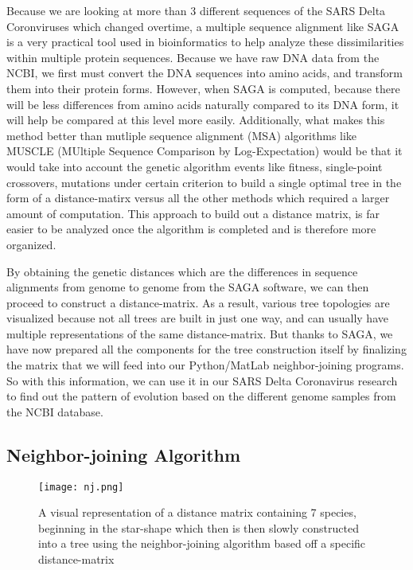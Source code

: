 Because we are looking at more than 3 different sequences of the SARS Delta Coronviruses which changed overtime, a multiple sequence alignment like SAGA is a very practical tool used in bioinformatics to help analyze these dissimilarities within multiple protein sequences. Because we have raw DNA data from the NCBI, we first must convert the DNA sequences into amino acids, and transform them into their protein forms. However, when SAGA is computed, because there will be less differences from amino acids naturally compared to its DNA form, it will help be compared at this level more easily. Additionally, what makes this method better than mutliple sequence alignment (MSA) algorithms like MUSCLE (MUltiple Sequence Comparison by Log-Expectation) would be that it would take into account the genetic algorithm events like fitness, single-point crossovers, mutations under certain criterion to build a single optimal tree in the form of a distance-matirx versus all the other methods which required a larger amount of computation. This approach to build out a distance matrix, is far easier to be analyzed once the algorithm is completed and is therefore more organized. 

By obtaining the genetic distances which are the differences in sequence alignments from genome to genome from the SAGA software, we can then proceed to construct a distance-matrix. As a result, various tree topologies are visualized because not all trees are built in just one way, and can usually have multiple representations of the same distance-matrix. But thanks to SAGA, we have now prepared all the components for the tree construction itself by finalizing the matrix that we will feed into our Python/MatLab neighbor-joining programs. So with this information, we can use it in our SARS Delta Coronavirus research to find out the pattern of evolution based on the different genome samples from the NCBI database.

\subsection{Neighbor-joining Algorithm}

\begin{figure}[h!]
\centering
\texttt{[image: nj.png]}
\caption{A visual representation of a distance matrix containing 7 species, beginning in the star-shape which then is then slowly constructed into a tree using the neighbor-joining algorithm based off a specific distance-matrix}
\end{figure}

